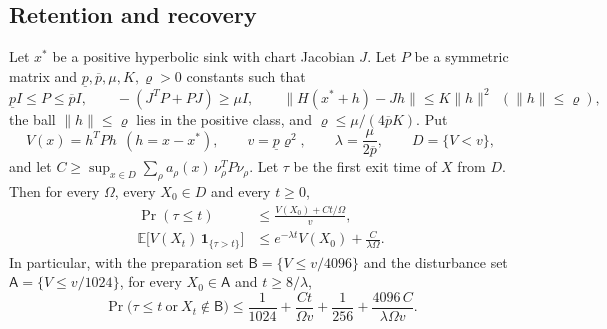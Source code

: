 \subsection{Retention and recovery}
\begin{theorem}\label{thm:finite}
Let \(x^*\) be a positive hyperbolic sink with chart Jacobian \(J\). Let \(P\) be a symmetric
matrix and \(\underline p,\overline p,\mu,K,\varrho>0\) constants such that
\begin{equation}\label{eq:lyap-hyp}
 \underline pI\le P\le\overline pI,\qquad -(J^TP+PJ)\ge\mu I,\qquad
 \|H(x^*+h)-Jh\|\le K\|h\|^2\ \ (\|h\|\le\varrho),
\end{equation}
the ball \(\|h\|\le\varrho\) lies in the positive class, and
\(\varrho\le\mu/(4\overline pK)\). Put
\[
 V(x)=h^TPh\ \ (h=x-x^*),\qquad v=\underline p\varrho^2,\qquad
 \lambda=\frac{\mu}{2\overline p},\qquad D=\{V<v\},
\]
and let \(C\ge\sup_{x\in D}\sum_\rho a_\rho(x)\,\nu_\rho^TP\nu_\rho\). Let \(\tau\) be the
first exit time of \(X\) from \(D\). Then for every \(\Omega\), every \(X_0\in D\) and every
\(t\ge0\),
\begin{align}
 \Pr(\tau\le t)&\le\frac{V(X_0)+Ct/\Omega}{v},\label{eq:retention}\\
 \mathbb E\bigl[V(X_t)\,\mathbf 1_{\{\tau>t\}}\bigr]
 &\le e^{-\lambda t}V(X_0)+\frac{C}{\lambda\Omega}.\label{eq:recovery}
\end{align}
In particular, with the preparation set \(\mathsf B=\{V\le v/4096\}\) and the disturbance set
\(\mathsf A=\{V\le v/1024\}\), for every \(X_0\in\mathsf A\) and \(t\ge8/\lambda\),
\begin{equation}\label{eq:recfailure}
 \Pr\bigl(\tau\le t\ \text{or}\ X_t\notin\mathsf B\bigr)
 \le\frac1{1024}+\frac{Ct}{\Omega v}+\frac1{256}+\frac{4096\,C}{\lambda\Omega v}.
\end{equation}
\end{theorem}
